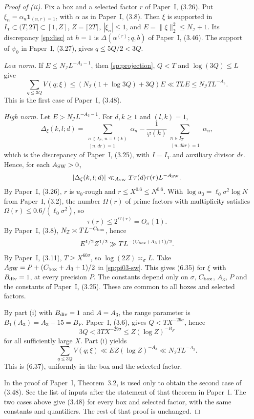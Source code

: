 \begin{proof}[Proof of \textup{(ii)}]
Fix a box and a selected factor $r$ of Paper~I, (3.26). Put
$\xi_n=\alpha_n\mathbf1_{(n,r)=1}$, with $\alpha$ as in Paper~I, (3.8).
Then $\xi$ is supported in $I_T\subset(T,2T]\subset[1,Z]$, $Z=\lceil2T\rceil$,
$|\xi_n|\le1$, and $E=\|\xi\|_2^2\le N_{\mathcal I}+1$. Its discrepancy
\eqref{sp:disc} at $h=1$ is $\Delta(\alpha^{(r)};q,b)$ of Paper~I, (3.46).
The support of $\psi_0$ in Paper~I, (3.27), gives $q\le5Q/2<3Q$.

\emph{Low norm.} If $E\le N_{\mathcal I}L^{-A_3-1}$, then
\eqref{sp:projection}, $Q<T$ and $\log(3Q)\le L$ give
\[
 \sum_{q\le3Q}V(q;\xi)\le(N_{\mathcal I}(1+\log3Q)+3Q)E\ll TLE\le N_{\mathcal I}TL^{-A_3}.
\]
This is the first case of Paper~I, (3.48).

\emph{High norm.} Let $E>N_{\mathcal I}L^{-A_3-1}$. For $d,k\ge1$ and
$(l,k)=1$,
\[
 \Delta_\xi(k,l;d)=\sum_{\substack{n\in I_T,\ n\equiv l\ (k)\\(n,dr)=1}}\alpha_n
 -\frac1{\varphi(k)}\sum_{\substack{n\in I_T\\(n,dkr)=1}}\alpha_n ,
\]
which is the discrepancy of Paper~I, (3.25), with $I=I_T$ and auxiliary
divisor $dr$. Hence, for each $A_{\rm SW}>0$,
\begin{equation}\label{sp:pi03-sw}
 |\Delta_\xi(k,l;d)|\ll_{A_{\rm SW}}T\tau(d)\tau(r)L^{-A_{\rm SW}} .
\end{equation}
By Paper~I, (3.26), $r$ is $u_0$-rough and $r\le X^{0.6}\le N^{0.6}$. With
$\log u_0=\ell_0\sigma^2\log N$ from Paper~I, (3.2), the number $\Omega(r)$
of prime factors with multiplicity satisfies
$\Omega(r)\le0.6/(\ell_0\sigma^2)$, so
\[
 \tau(r)\le2^{\Omega(r)}=O_\sigma(1).
\]
By Paper~I, (3.8), $N_{\mathcal I}\asymp TL^{-C_{\rm box}}$, hence
\[
 E^{1/2}Z^{1/2}\gg TL^{-(C_{\rm box}+A_3+1)/2}.
\]
By Paper~I, (3.11), $T\ge X^{60\sigma}$, so $\log(2Z)\asymp_\sigma L$.
Take $A_{\rm SW}=P+(C_{\rm box}+A_3+1)/2$ in \eqref{sp:pi03-sw}. This gives
(6.35) for $\xi$ with $B_{\rm div}=1$, at every precision $P$. The
constants depend only on $\sigma$, $C_{\rm box}$, $A_3$, $P$ and the
constants of Paper~I, (3.25). These are common to all boxes and selected
factors.

By part (i) with $B_{\rm div}=1$ and $A=A_3$, the range parameter is
$B_1(A_3)=A_3+15=B_F$. Paper~I, (3.6), gives $Q<TX^{-29\sigma}$, hence
\[
 3Q<3TX^{-29\sigma}\le Z(\log Z)^{-B_F}
\]
for all sufficiently large $X$. Part (i) yields
\[
 \sum_{q\le3Q}V(q;\xi)\ll EZ(\log Z)^{-A_3}\ll N_{\mathcal I}TL^{-A_3}.
\]
This is (6.37), uniformly in the box and the selected factor.

In the proof of Paper~I, Theorem~3.2, \cite[Theorem~0(a)]{BFI86} is used
only to obtain the second case of (3.48). See the list of inputs after the
statement of that theorem in Paper~I. The two cases above give (3.48) for
every box and selected factor, with the same constants and quantifiers.
The rest of that proof is unchanged.
\end{proof}

